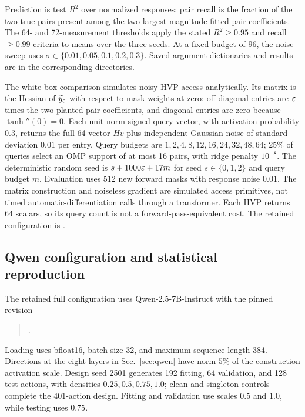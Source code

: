 Prediction is test $R^2$ over normalized responses; pair recall is the fraction of the two true pairs present among the two largest-magnitude fitted pair coefficients. The 64- and 72-measurement thresholds apply the stated $R^2\ge0.95$ and recall $\ge0.99$ criteria to means over the three seeds. At a fixed budget of 96, the noise sweep uses $\sigma\in\{0.01,0.05,0.1,0.2,0.3\}$. Saved argument dictionaries and results are in the corresponding  directories.

The white-box comparison simulates noisy HVP access analytically. Its matrix is the Hessian of $\widetilde y_{\varepsilon}$ with respect to mask weights at zero: off-diagonal entries are $\varepsilon$ times the two planted pair coefficients, and diagonal entries are zero because $\tanh''(0)=0$. Each unit-norm signed query vector, with activation probability $0.3$, returns the full 64-vector $Hv$ plus independent Gaussian noise of standard deviation $0.01$ per entry. Query budgets are $1,2,4,8,12,16,24,32,48,64$; 25\% of queries select an OMP support of at most 16 pairs, with ridge penalty $10^{-8}$. The deterministic random seed is $s+1000\varepsilon+17m$ for seed $s\in\{0,1,2\}$ and query budget $m$. Evaluation uses 512 new forward masks with response noise $0.01$. The matrix construction and noiseless gradient are simulated access primitives, not timed automatic-differentiation calls through a transformer. Each HVP returns 64 scalars, so its query count is not a forward-pass-equivalent cost. The retained configuration is .

\subsection{Qwen configuration and statistical reproduction}\label{app:qwen-reproduction}

The retained full configuration uses Qwen-2.5-7B-Instruct with the pinned revision
\begin{quote}
.
\end{quote}
Loading uses bfloat16, batch size 32, and maximum sequence length 384. Directions at the eight layers in Sec.~\ref{sec:qwen} have norm $5\%$ of the construction activation scale. Design seed 2501 generates 192 fitting, 64 validation, and 128 test actions, with densities $0.25,0.5,0.75,1.0$; clean and singleton controls complete the 401-action design. Fitting and validation use scales $0.5$ and $1.0$, while testing uses $0.75$.

